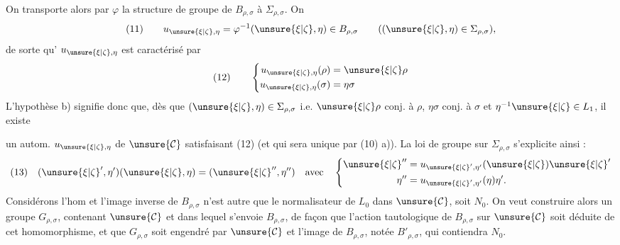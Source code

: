 On transporte alors par $\varphi$ la structure de groupe de $B_{\rho,\sigma}$ à $\Sigma_{\rho,\sigma}$. On 
\[
(11)\qquad u_{\unsure{\xi|\zeta},\eta}=\varphi^{-1}(\unsure{\xi|\zeta},\eta)\in B_{\rho,\sigma}
\qquad((\unsure{\xi|\zeta},\eta)\in\Sigma_{\rho,\sigma}),
\]
de sorte qu' $u_{\unsure{\xi|\zeta},\eta}$ est caractérisé par
\[
(12)\qquad\left\{\begin{aligned}
u_{\unsure{\xi|\zeta},\eta}(\rho)&=\unsure{\xi|\zeta}\rho\\
u_{\unsure{\xi|\zeta},\eta}(\sigma)&=\eta\sigma
\end{aligned}\right.
\]
L'hypothèse b) signifie donc que, dès que $(\unsure{\xi|\zeta},\eta)\in\Sigma_{\rho,\sigma}$ i.e. $\unsure{\xi|\zeta}\rho$ conj. à $\rho$, $\eta\sigma$ conj. à $\sigma$ et $\eta^{-1}\unsure{\xi|\zeta}\in L_1$, il existe

un autom. $u_{\unsure{\xi|\zeta},\eta}$ de $\unsure{\mathcal{C}}$ satisfaisant (12) (et qui sera unique par (10) a)). La loi de groupe sur $\Sigma_{\rho,\sigma}$ s'explicite ainsi :
\[
(13)\quad(\unsure{\xi|\zeta}',\eta')(\unsure{\xi|\zeta},\eta)=(\unsure{\xi|\zeta}'',\eta'')\quad\text{avec}\quad
\left\{\begin{aligned}
\unsure{\xi|\zeta}''&=u_{\unsure{\xi|\zeta}',\eta'}(\unsure{\xi|\zeta})\unsure{\xi|\zeta}'\\
\eta''&=u_{\unsure{\xi|\zeta}',\eta'}(\eta)\eta'.
\end{aligned}\right.
\]
Considérons l'hom 
 
et l'image inverse de $B_{\rho,\sigma}$ n'est autre que le normalisateur de $L_0$ dans $\unsure{\mathcal{C}}$, soit $N_0$. On veut construire alors un groupe $G_{\rho,\sigma}$, contenant $\unsure{\mathcal{C}}$  et dans lequel  s'envoie $B_{\rho,\sigma}$, de façon que l'action tautologique de $B_{\rho,\sigma}$ sur $\unsure{\mathcal{C}}$ soit déduite de cet homomorphisme, et que $G_{\rho,\sigma}$ soit engendré par $\unsure{\mathcal{C}}$ et l'image de $B_{\rho,\sigma}$, notée $B'_{\rho,\sigma}$, qui contiendra  $N_0$.


